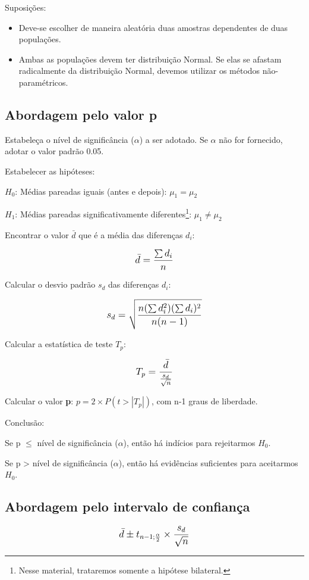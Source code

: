 Suposições:
\begin{itemize}
	\item Deve-se escolher de maneira aleatória duas amostras dependentes de duas populações.
	\item Ambas as populações devem ter distribuição Normal. Se elas se afastam radicalmente da distribuição Normal, devemos utilizar os métodos não-paramétricos.
\end{itemize}

\subsection{Abordagem pelo valor p}

\begin{alineas}
	\item Estabeleça o nível de significância (\(\alpha\)) a ser adotado. Se \(\alpha\) não for fornecido, adotar o valor padrão 0.05.
	\item Estabelecer as hipóteses:
		\begin{alineas}
			\item \(H_0\): Médias pareadas iguais (antes e depois): \(\mu_1 = \mu_2\)
			\item \(H_1\): Médias pareadas significativamente diferentes\footnote{Nesse material, trataremos somente a hipótese bilateral.}: \(\mu_1 \neq \mu_2\)
		\end{alineas}
	\item Encontrar o valor \(\bar{d}\) que é a média das diferenças \(d_i\): 

	\[\beq{ \bar{d} = \frac{\sum{d_i}}{n} }\]

	\item Calcular o desvio padrão \(s_d\) das diferenças \(d_i\):

	\[\beq{ s_d = \sqrt{\frac{n(\sum{d_i^2})(\sum{d_i})^2}{n(n-1)}} }\]	
	
	\item Calcular a estatística de teste \(T_p\):
	
	\[\beq{ T_p = \frac{\bar{d}}{ \frac{s_d}{\sqrt{n}}} }\]
	
	\item Calcular o valor \textbf{p}: \(p = 2 \times P(t>|T_p|) \), com n-1 graus de liberdade.

	\item Conclusão:
		\begin{alineas}
			\item Se p \(\leq\) nível de significância (\(\alpha\)), então há indícios para rejeitarmos \(H_0\).
			\item Se p > nível de significância (\(\alpha\)), então há evidências suficientes para aceitarmos \(H_0\).
		\end{alineas}

\subsection{Abordagem pelo intervalo de confiança}

\[\beq{ \bar{d} \pm t_{n-1;\frac{\alpha}{2}} \times \frac{s_d}{\sqrt{n}}  }\]
	
\end{alineas}

